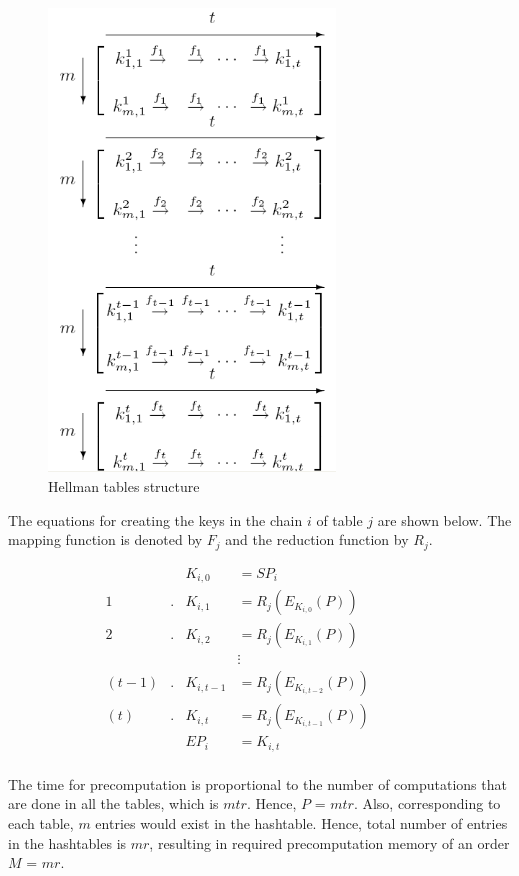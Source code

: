 \begin{figure}[ht!]
	\centering
		\includegraphics[width=3in]{./figures/hellman-tables.PNG}
	\caption{Hellman tables structure}	
	\label{fig:hellman-tables}
\end{figure}

The equations for creating the keys in the chain $i$ of table $j$ are shown below. The mapping function is denoted by $F_j$ and the reduction function by $R_j$.

\begin{align*}
& & K_{i,0} & = SP_i & & & &\\
1&. &K_{i,1} & = R_j(E_{K_{i,0}}(P)) & & & &\\
2&. &K_{i,2} & = R_j(E_{K_{i,1}}(P)) & & & &\\
& & &\vdots & & & &\\
(t-1)&. &K_{i,t-1} & = R_j(E_{K_{i,t-2}}(P)) & & & &\\
(t)&. &K_{i,t} & = R_j(E_{K_{i,t-1}}(P)) & & & &\\
& & EP_i & = K_{i,t} & & & &\\
\end{align*}

The time for precomputation is proportional to the number of computations that are done in all the tables, which is $mtr$. Hence, $P$ = $mtr$. Also, corresponding to each table, $m$ entries would exist in the hashtable. Hence, total number of entries in the hashtables is $mr$, resulting in required precomputation memory of an order $M$ = $mr$.\\

